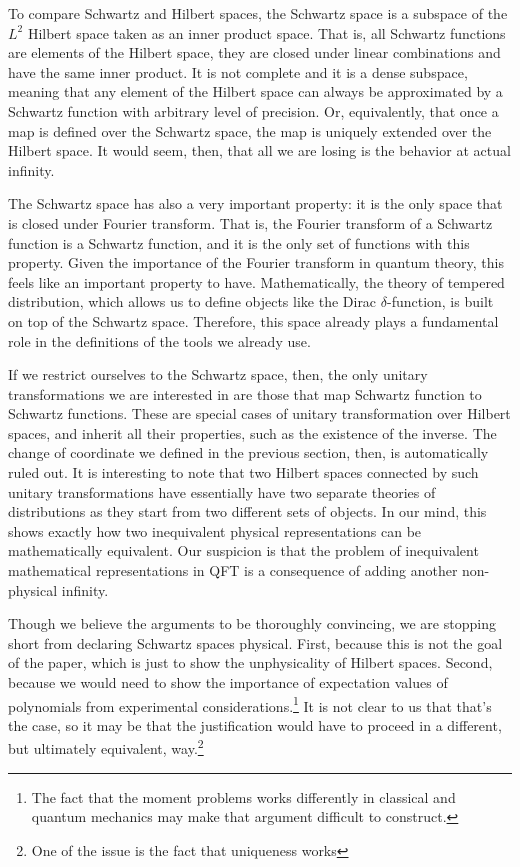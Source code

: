 \documentclass[10pt,twocolumn, nofootinbib]{revtex4-2}
\begin{document}
To compare Schwartz and Hilbert spaces, the Schwartz space is a subspace of the $L^2$ Hilbert space taken as an inner product space. That is, all Schwartz functions are elements of the Hilbert space, they are closed under linear combinations and have the same inner product. It is not complete and it is a dense subspace, meaning that any element of the Hilbert space can always be approximated by a Schwartz function with arbitrary level of precision. Or, equivalently, that once a map is defined over the Schwartz space, the map is uniquely extended over the Hilbert space. It would seem, then, that all we are losing is the behavior at  actual infinity.

The Schwartz space has also a very important property: it is the only space that is closed under Fourier transform. That is, the Fourier transform of a Schwartz function is a Schwartz function, and it is the only set of functions with this property. Given the importance of the Fourier transform in quantum theory, this feels like an important property to have. Mathematically, the theory of tempered distribution, which allows us to define objects like the Dirac $\delta$-function, is built on top of the Schwartz space. Therefore, this space already plays a fundamental role in the definitions of the tools we already use.

If we restrict ourselves to the Schwartz space, then, the only unitary transformations we are interested in are those that map Schwartz function to Schwartz functions. These are special cases of unitary transformation over Hilbert spaces, and inherit all their properties, such as the existence of the inverse. The change of coordinate we defined in the previous section, then, is automatically ruled out. It is interesting to note that two Hilbert spaces connected by such unitary transformations have essentially have two separate theories of distributions as they start from two different sets of objects. In our mind, this shows exactly how two inequivalent physical representations can be mathematically equivalent. Our suspicion is that the problem of inequivalent mathematical representations in QFT is a consequence of adding another non-physical infinity.

Though we believe the arguments to be thoroughly convincing, we are stopping short from declaring Schwartz spaces physical. First, because this is not the goal of the paper, which is just to show the unphysicality of Hilbert spaces. Second, because we would need to show the importance of expectation values of polynomials from experimental considerations.\footnote{The fact that the moment problems works differently in classical and quantum mechanics may make that argument difficult to construct.} It is not clear to us that that's the case, so it may be that the justification would have to proceed in a different, but ultimately equivalent, way.\footnote{One of the issue is the fact that uniqueness works}
\end{document}
